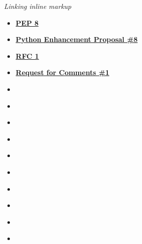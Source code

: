\documentclass[letterpaper,10pt,english]{sphinxhowto}
\begin{document}
\emph{Linking inline markup}
\begin{itemize}
\item {} 
\href{https://www.python.org/dev/peps/pep-0008}{\textbf{PEP 8}}

\item {} 
\href{https://www.python.org/dev/peps/pep-0008}{\textbf{Python Enhancement Proposal \#8}}

\item {} 
\href{https://tools.ietf.org/html/rfc1.html}{\textbf{RFC 1}}

\item {} 
\href{https://tools.ietf.org/html/rfc1.html}{\textbf{Request for Comments \#1}}

\item {} 

\item {} 
{\hyperref[markup:with]{}}

\item {} 
{\hyperref[markup:grammar\string-token\string-try_stmt]{}}

\item {} 
{\hyperref[markup:admonition\string-section]{}}

\item {} 
{\hyperref[markup:some\string-label]{}}

\item {} 
{\hyperref[markup:some\string-label]{}}

\item {} 
{\hyperref[markup:my\string-figure]{}}

\item {} 
{\hyperref[markup:my\string-figure\string-name]{}}

\item {} 
{\hyperref[markup:my\string-table]{}}

\item {} 
{\hyperref[markup:my\string-table\string-name]{}}


\end{itemize}
\end{document}
